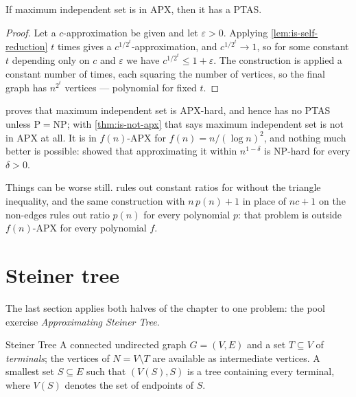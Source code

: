 \begin{theorem}\label{thm:is-not-apx}
If maximum independent set is in \textrm{APX}, then it has a PTAS.
\end{theorem}

\begin{proof}
Let a $c$-approximation be given and let $\varepsilon > 0$. Applying
\cref{lem:is-self-reduction} $t$ times gives a $c^{1/2^t}$-approximation, and
$c^{1/2^t} \to 1$, so for some constant $t$ depending only on $c$ and
$\varepsilon$ we have $c^{1/2^t} \le 1+\varepsilon$. The construction is applied
a constant number of times, each squaring the number of vertices, so the final
graph has $n^{2^t}$ vertices --- polynomial for fixed $t$.
\end{proof}

 proves that maximum independent set is \textrm{APX}-hard, and
hence has no PTAS unless $\mathrm{P} = \mathrm{NP}$; with
\cref{thm:is-not-apx} that says maximum independent set is not in \textrm{APX}
at all. It is in $f(n)$-APX for $f(n) = n/(\log n)^2$, and nothing much better
is possible: \citet{Zuckerman2007} showed that approximating it within
$n^{1-\delta}$ is \textrm{NP}-hard for every $\delta > 0$.

Things can be worse still.  rules out constant ratios
for  without the triangle inequality, and the same construction with
$n\,p(n) + 1$ in place of $nc + 1$ on the non-edges rules out ratio $p(n)$ for
every polynomial $p$: that problem is outside $f(n)$-APX for every polynomial
$f$.

\section{Steiner tree}
\label{sec:steiner-tree}

The last section applies both halves of the chapter to one problem: the pool
exercise \emph{Approximating Steiner Tree}.

\begin{probdef}{Steiner Tree}
  \instance A connected undirected graph $G = (V,E)$ and a set $T \subseteq V$
  of \emph{terminals}; the vertices of $N = V \setminus T$ are available as
  intermediate vertices.
  \question A smallest set $S \subseteq E$ such that $(V(S),S)$ is a tree
  containing every terminal, where $V(S)$ denotes the set of endpoints of $S$.
\end{probdef}

